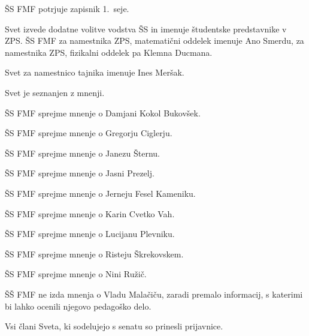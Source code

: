 \documentclass{seja}
\begin{document}
\begin{ad}
\item
\begin{sklep*}
  ŠS FMF potrjuje zapisnik 1.~seje.
\end{sklep*}

\item
Svet  izvede dodatne volitve vodstva ŠS in  imenuje študentske predstavnike v ZPS.
ŠS FMF za namestnika ZPS, matematični oddelek imenuje Ano Smerdu, za namestnika
ZPS, fizikalni oddelek pa Klemna Ducmana.

Svet za namestnico tajnika imenuje Ines Meršak.

\item
Svet je seznanjen z mnenji.

\begin{sklep*} ŠS FMF sprejme mnenje o Damjani Kokol Bukovšek.  \end{sklep*}
\begin{sklep*} ŠS FMF sprejme mnenje o Gregorju Ciglerju.       \end{sklep*}
\begin{sklep*} ŠS FMF sprejme mnenje o Janezu Šternu.           \end{sklep*}
\begin{sklep*} ŠS FMF sprejme mnenje o Jasni Prezelj.           \end{sklep*}
\begin{sklep*} ŠS FMF sprejme mnenje o Jerneju Fesel Kameniku.  \end{sklep*}
\begin{sklep*} ŠS FMF sprejme mnenje o Karin Cvetko Vah.        \end{sklep*}
\begin{sklep*} ŠS FMF sprejme mnenje o Lucijanu Plevniku.       \end{sklep*}
\begin{sklep*} ŠS FMF sprejme mnenje o Risteju Škrekovskem.     \end{sklep*}
\begin{sklep*} ŠS FMF sprejme mnenje o Nini Ružič.              \end{sklep*}

\begin{sklep*} ŠŠ FMF ne izda mnenja o Vladu Malačiču, zaradi premalo
informacij, s katerimi bi lahko ocenili njegovo pedagoško delo.
\end{sklep*}

\item
Vsi člani Sveta, ki sodelujejo s senatu so prinesli prijavnice.


\end{ad}
\end{document}

